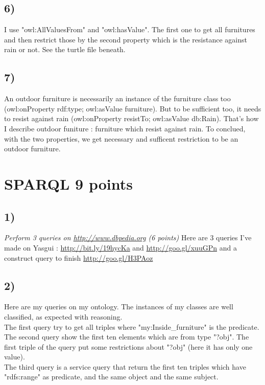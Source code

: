 \documentclass{article}
\begin{document}
	\subsection{6) }
		I use "owl:AllValuesFrom" and "owl:hasValue".
		The first one to get all furnitures and then restrict those by the second property which is the resistance against rain or not.
		See the turtle file beneath.
	\subsection{7) }
		An outdoor furniture is necessarily an instance of the furniture class too (owl:onProperty rdf:type; owl:asValue furniture).
		But to be sufficient too, it needs to resist against rain (owl:onProperty resistTo; owl:asValue db:Rain).
		That's how I describe outdoor funiture : furniture which resist against rain.
		To conclued, with the two properties, we get necessary and sufficent restriction to be an outdoor furniture.
% 	
\newpage

\section{SPARQL 9 points}
	\subsection{1) }
		\textit{Perform 3 queries on \url{http://www.dbpedia.org} (6 points)}
		Here are 3 queries I've made on Yasgui : \url{http://bit.ly/19hycKa} and \url{http://goo.gl/xuuGPn} and a construct query to finish \url{http://goo.gl/H3PAoz}
	\subsection{2) }
		Here are my queries on my ontology. The instances of my classes are well classified, as expected with reasoning.\\
		The first query try to get all triples where "my:Inside\_furniture" is the predicate.
		The second query show the first ten elements which are from type "?obj".
		The first triple of the query put some restrictions about "?obj" (here it has only one value).\\
		The third query is a service query that return the first ten triples which have "rdfs:range" as predicate, and the same object and the same subject.\\
		\newline
\end{document}

